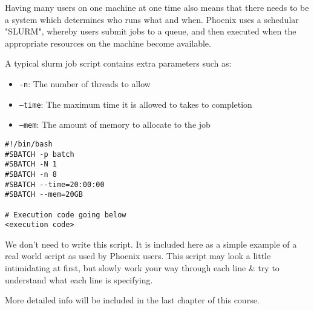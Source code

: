 \begin{information}
Having many users on one machine at one time also means that there needs to be a system which
determines who runs what and when. 
Phoenix uses a schedular "SLURM", whereby users submit jobs to a queue, and then executed when the
appropriate resources on the machine become available. 

A typical slurm job script contains extra parameters such as:

\begin{itemize}
\item \texttt{-n}: The number of threads to allow
\item \texttt{--time}: The maximum time it is allowed to takes to completion
\item \texttt{--mem}: The amount of memory to allocate to the job
\end{itemize}

\begin{lstlisting}
#!/bin/bash
#SBATCH -p batch
#SBATCH -N 1
#SBATCH -n 8
#SBATCH --time=20:00:00
#SBATCH --mem=20GB

# Execution code going below
<execution code>

\end{lstlisting}

We don't need to write this script.
It is included here as a simple example of a real world script as used by Phoenix users.
This script may look a little intimidating at first, but slowly work your way through each line \&
try to understand what each line is specifying.

More detailed info will be included in the last chapter of this course. 
\end{information}
